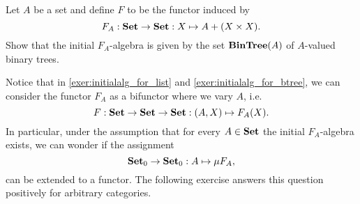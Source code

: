 %    
%
%    
%
%

\begin{exer}\label{exer:initialalg_for_btree} Let $A$ be a set and define $F$ to be the functor induced by 
\[
F_A:\mathbf{Set}\to\mathbf{Set} : X\mapsto A + (X\times X).
\]
Show that the initial $F_A$-algebra is given by the set $\mathbf{BinTree}(A)$ of $A$-valued binary trees.
\end{exer}

\begin{rem} Notice that in \cref{exer:initialalg_for_list} and \cref{exer:initialalg_for_btree}, we can consider the functor $F_A$ as a bifunctor where we vary $A$, i.e.
\[
F: \mathbf{Set}\to \mathbf{Set}\to \mathbf{Set}: (A,X)\mapsto F_A(X).
\]
In particular, under the assumption that for every $A\in\mathbf{Set}$ the initial $F_A$-algebra exists, we can wonder if the assignment 
\[
{\mathbf{Set}}_0 \to {\mathbf{Set}}_0 : A\mapsto \mu F_A ,
\]
can be extended to a functor. The following exercise answers this question positively for arbitrary categories.
\end{rem}

